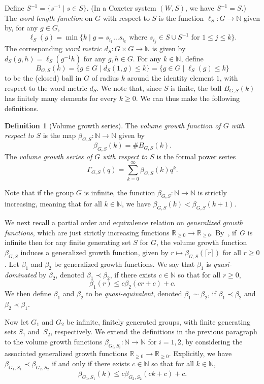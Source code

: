 \documentclass[11pt]{amsart}
\theoremstyle{plain}
\theoremstyle{definition}
\newtheorem{definition}[thm]{Definition}
\newcommand{\R}{\mathbb{R}}
\newcommand{\N}{\mathbb{N}}
\numberwithin{equation}{subsection}
\begin{document}
Define $S^{-1} = \{ s^{-1} \mid s \in S \}$.  (In a Coxeter system $(W,S)$, we have $S^{-1} = S$.) The \emph{word length function} on $G$ with respect to $S$ is the function $\ell_S: G \to \N$ given by, for any $g \in G$, 
\[
\ell_S(g) = \min \{ k \mid g = s_{i_1} \dots s_{i_k} \mbox{ where }s_{i_j} \in S \cup S^{-1} \mbox{ for }1 \leq j \leq k \}.
\]
The corresponding \emph{word metric} $d_S: G \times G \to \N$ is given by $d_S(g,h) = \ell_S(g^{-1}h)$  for any $g, h \in G$.
For any $k \in \N$, define
\[
B_{G,S}(k) = \{ g \in G \mid d_S(1,g) \leq k \} = \{ g \in G \mid \ell_S(g) \leq k \}
\]
to be the (closed) ball in $G$ of radius $k$ around the identity element $1$, with respect to the word metric $d_S$. We note that, since $S$ is finite, the ball $B_{G,S}(k)$ has finitely many elements for every $k \geq 0$. We can thus make the following definitions.

\begin{definition}[Volume growth series]\label{defn:growth} The \emph{volume growth function of $G$ with respect to $S$} is the map $\beta_{G,S}:\N \to \N$ given by
\[
\beta_{G,S}(k) = \# B_{G,S}(k).
\]
The \emph{volume growth series of $G$ with respect to $S$} is the formal power series
\[
	\Gamma_{G,S}(q)
	=
	\sum_{k=0}^\infty \beta_{G,S}(k) q^k.
\]
\end{definition}

Note that if the group $G$ is infinite, the function $\beta_{G,S}:\N \to \N$ is strictly increasing, meaning that for all $k \in \N$, we have $\beta_{G,S}(k) < \beta_{G,S}(k+1)$.

We next recall a partial order and equivalence relation on \emph{generalized growth functions}, which are just strictly increasing functions $\R_{\geq 0} \to \R_{\geq 0}$. By~\cite[Example 6.2.3]{Loeh}, if~$G$ is infinite then for any finite generating set $S$ for $G$, the volume growth function $\beta_{G,S}$ induces a generalized growth function, given by $r \mapsto \beta_{G,S}(\lceil r \rceil)$  for all $r \geq 0$. Let $\beta_1$ and $\beta_2$ be generalized growth functions. We say that $\beta_1$ is \emph{quasi-dominated} by $\beta_2$, denoted $\beta_1 \prec \beta_2$, if there exists $c \in \N$ so that for all $r \geq 0$,
\[
\beta_1(r) \leq c \beta_2(c r + c) + c.
\]
We then define $\beta_1$ and $\beta_2$ to be \emph{quasi-equivalent}, denoted $\beta_1 \sim \beta_2$, if $\beta_1 \prec \beta_2$ and $\beta_2 \prec \beta_1$. 


Now let $G_1$ and $G_2$ be infinite, finitely generated groups, with finite generating sets $S_1$ and~$S_2$, respectively. We extend the  definitions in the previous paragraph to the volume growth functions $\beta_{G_i,S_i}:\N \to \N$ for $i = 1,2$, by considering the associated generalized growth functions $\R_{\geq 0} \to \R_{\geq 0}$. Explicitly, we have $\beta_{G_1,S_1} \prec \beta_{G_2,S_2}$ if and only if there exists $c \in \N$ so that for all $k \in \N$,
\[
\beta_{G_1,S_1}(k) \leq c \beta_{G_2,S_2}(c k + c) + c.
\]
\end{document}

